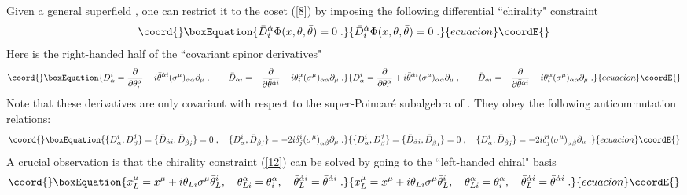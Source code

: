 \documentclass[a4paper,12pt]{article}
\begin{document}
Given a general superfield \coordHE{}, one can 
restrict it to the coset (\ref{8}) by imposing the following 
differential ``chirality" constraint \cite{fwz} 
\begin{equation}\coord{}\boxEquation{\label{12}
  \bar D^{\dot\alpha}_i \Phi(x,\theta,\bar\theta) = 0\;.
}{\bar D^{\dot\alpha}_i \Phi(x,\theta,\bar\theta) = 0\;.
}{ecuacion}\coordE{}\end{equation}
Here \coordHE{} is the right-handed half of the ``covariant spinor 
derivatives" 
\begin{equation}\coord{}\boxEquation{\label{13}
D^i_\alpha = {\partial\over 
\partial \theta^\alpha_i}+
i\bar\theta^{\dot\alpha i}(\sigma^\mu)_{\alpha\dot\alpha} 
\partial_\mu\;, \qquad
\bar D_{\dot\alpha i} = -{\partial\over \partial 
\bar\theta^{\dot\alpha i}}- i\theta^\alpha_i 
(\sigma^\mu)_{\alpha\dot\alpha} \partial_\mu\;. 
}{D^i_\alpha = {\partial\over 
\partial \theta^\alpha_i}+
i\bar\theta^{\dot\alpha i}(\sigma^\mu)_{\alpha\dot\alpha} 
\partial_\mu\;, \qquad
\bar D_{\dot\alpha i} = -{\partial\over \partial 
\bar\theta^{\dot\alpha i}}- i\theta^\alpha_i 
(\sigma^\mu)_{\alpha\dot\alpha} \partial_\mu\;. 
}{ecuacion}\coordE{}\end{equation}
Note that these derivatives are only covariant with respect to the 
super-Poincar\'{e} subalgebra of \coordHE{}. They obey the 
following anticommutation relations: 
\begin{equation}\coord{}\boxEquation{\label{14}
  \{D^i_\alpha,D^j_\beta\} = \{\bar D_{\dot\alpha i},\bar D_{\dot\beta j}\} =
  0\;, \quad \{D^i_\alpha,\bar D_{\dot\beta j}\} = -2i\delta^i_j
  (\sigma^\mu)_{\alpha\dot\beta}\partial_\mu\;.
}{\{D^i_\alpha,D^j_\beta\} = \{\bar D_{\dot\alpha i},\bar D_{\dot\beta j}\} =
  0\;, \quad \{D^i_\alpha,\bar D_{\dot\beta j}\} = -2i\delta^i_j
  (\sigma^\mu)_{\alpha\dot\beta}\partial_\mu\;.
}{ecuacion}\coordE{}\end{equation}
A crucial observation is that the chirality constraint (\ref{12}) 
can be solved by going to the ``left-handed chiral" basis 
\begin{equation}\coord{}\boxEquation{
x^\mu_L=x^\mu+i\theta_{Li}\sigma^\mu\bar\theta^i_L, \ \ \ 
\theta^\alpha_{Li} =\theta^\alpha_i,\ \ \ \bar\theta^{\dot\alpha 
i}_L = \bar\theta^{\dot\alpha i}\;. \label{15}
}{
x^\mu_L=x^\mu+i\theta_{Li}\sigma^\mu\bar\theta^i_L, \ \ \ 
\theta^\alpha_{Li} =\theta^\alpha_i,\ \ \ \bar\theta^{\dot\alpha 
i}_L = \bar\theta^{\dot\alpha i}\;. }{ecuacion}\coordE{}\end{equation} 
\end{document}
